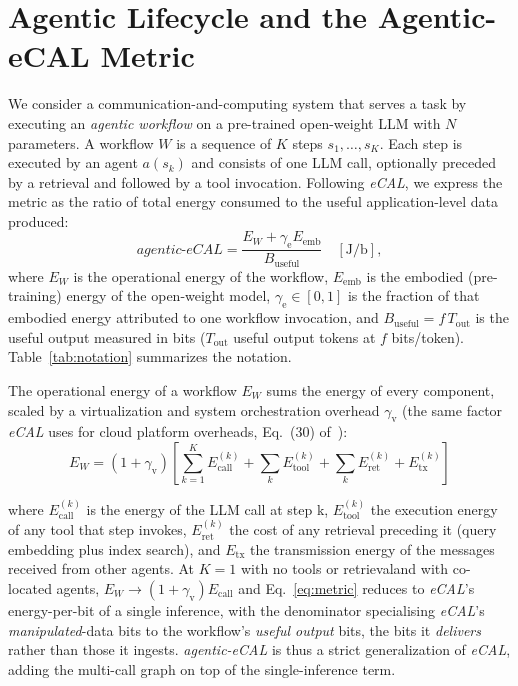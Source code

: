 \documentclass[journal]{IEEEtran}
\newcommand{\agecal}{\textit{agentic-eCAL}}
\newcommand{\ecal}{\textit{eCAL}}
\begin{document}
\section{Agentic Lifecycle and the Agentic-eCAL Metric}\label{sec:metric}
We consider a communication-and-computing system that serves a task by executing an \emph{agentic
workflow} on a pre-trained open-weight LLM with $N$ parameters. A workflow $W$ is a sequence of
$K$ steps $s_1,\dots,s_K$. Each step is executed by an agent $a(s_k)$ and consists of one LLM call,
optionally preceded by a retrieval and followed by a tool invocation. Following \ecal{}, we express
the metric as the ratio of total energy consumed to the useful application-level data produced:
\begin{equation}
\agecal = \frac{E_W + \gamma_{\mathrm{e}} E_{\mathrm{emb}}}{B_{\mathrm{useful}}} \quad [\mathrm{J/b}],
\label{eq:metric}
\end{equation}
where $E_W$ is the operational energy of the workflow, $E_{\mathrm{emb}}$ is the embodied
(pre-training) energy of the open-weight model, $\gamma_{\mathrm{e}}\in[0,1]$ is the fraction of that
embodied energy attributed to one workflow invocation, and
$B_{\mathrm{useful}} = f\,T_{\mathrm{out}}$ is the useful output measured in bits ($T_{\mathrm{out}}$
useful output tokens at $f$ bits/token). Table~\ref{tab:notation} summarizes the notation.

The operational energy of a workflow $E_{W}$ sums the energy of every component, scaled by a virtualization and system 
orchestration overhead $\gamma_{\mathrm{v}}$ (the same factor \ecal{} uses for cloud platform
overheads, Eq.~(30) of~\cite{chou2026ecal}):
\begin{equation}
E_W = (1+\gamma_{\mathrm{v}})\!\left[\sum_{k=1}^{K} E_{\mathrm{call}}^{(k)} + \sum_{k} E_{\mathrm{tool}}^{(k)} + \sum_{k} E_{\mathrm{ret}}^{(k)} + E_{\mathrm{tx}}^{(k)}\right]
\label{eq:ew}
\end{equation}

\noindent where $E_{\mathrm{call}}^{(k)}$ is the energy of the LLM call at step k, $E_{\mathrm{tool}}^{(k)}$ the execution energy of any tool that step invokes, $E_{\mathrm{ret}}^{(k)}$ the cost of any retrieval preceding it (query embedding plus index search), and $E_{\mathrm{tx}}$ the transmission energy of the messages received from other  agents. At $\!K\!=\!1$ with no tools or retrievaland with co-located agents, $E_W\!\to\!(1{+}\gamma_{\mathrm{v}})E_{\mathrm{call}}$ and
Eq.~\eqref{eq:metric} reduces to \ecal{}'s energy-per-bit of a single inference, with the denominator
specialising \ecal{}'s \emph{manipulated}-data bits to the workflow's \emph{useful output} bits, the
bits it \emph{delivers} rather than those it ingests. \agecal{} is thus a strict generalization of
\ecal{}, adding the multi-call graph on top of the single-inference term.
\end{document}
